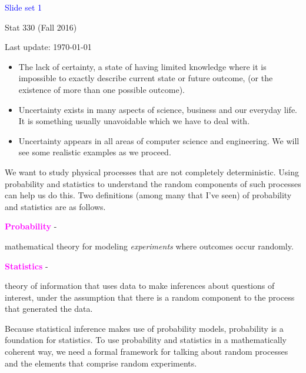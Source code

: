 \documentclass[20pt,landscape]{foils}
\newcommand{\bd}{\textbf}
\newcommand{\no}{\noindent}
\newcommand{\bi}{\begin{itemize}}
\newcommand{\ei}{\end{itemize}}
\newcommand \h {\hspace*{.3in}}
\newcommand{\bul}{\hspace*{.3in}{\textcolor{red}{$\bullet$ \ }}}
\begin{document}
\LogoOff

\foilhead[1.3in]{}
\centerline{\LARGE \textcolor{blue}{Slide set 1}}
\vspace{0.3in}
\centerline{\large Stat 330 (Fall 2016)}
\vspace{0.2in}
\centerline{\tiny Last update: \today}
\setcounter{page}{0}

\foilhead[-.7in]{\textcolor{blue}{Uncertainty/Randomness}}

\bi
\item[\bul] The lack of certainty, a state of having limited knowledge where it is impossible to exactly describe current state or future outcome, (or the existence of more than one possible outcome).
\item[\bul] Uncertainty exists in many aspects of science, business and our everyday life. It is something usually unavoidable  which we have to deal with.
\item[\bul] Uncertainty appears in all areas of computer science and engineering. We will see some realistic examples as we proceed.
\ei

\foilhead[-.65in]{\textcolor{blue}{Probability and Statistics}}
\no We want to study physical processes that are not completely deterministic. Using probability and statistics to understand the random components of such processes can help us do this. Two definitions (among many that I've seen) of probability and statistics are as follows. 

\h \textcolor{magenta}{\bd{Probability}} - \parbox[t]{6.5in}{mathematical theory for modeling \emph{experiments} where outcomes occur randomly.} 

\h \textcolor{magenta}{\bd{Statistics}} - \parbox[t]{6.5in}{theory of information that uses data to make inferences about questions of interest, under the assumption that there is a random component to the process that generated the data.} 

\no Because statistical inference makes use of probability models, probability is a foundation for statistics. To use probability and statistics in a mathematically coherent way, we need a formal framework for talking about random processes and the elements that comprise random experiments. 
\end{document}
